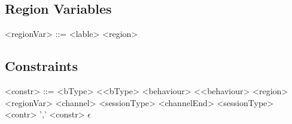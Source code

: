 \documentclass[12pt]{article}
\begin{document}
\subsection {Region Variables}

\begin{grammar}

<regionVar> ::= <lable>
\alt <region>

\end{grammar}

\subsection{Constraints}

\begin{grammar}

<constr> ::= <bType> \textless <bType>
\alt <behaviour> \textless <behaviour>
\alt <region> \texttildelow <regionVar>
\alt <channel> \texttildelow <sessionType>
\alt <channelEnd> \texttildelow <sessionType>
\alt <contr> ',' <constr>
\alt $\epsilon$

\end{grammar}


\end{document}
